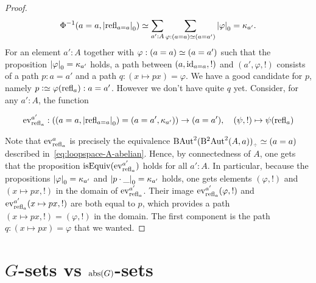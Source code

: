 \begin{proof}
\begin{displaymath}
    \Phi^{-1}(a=a,{\lvert\mathrm{refl}_{a=a}\rvert}_0) \simeq \sum_{a':A}
    \sum_{\varphi : (a=a) \simeq (a=a')}{\lvert\varphi\rvert}_0 = \kappa_{a'}.
  \end{displaymath}
  For an element $a':A$ together with $\varphi: (a=a) \simeq (a=a')$
  such that the proposition ${\lvert\varphi\rvert}_0 = \kappa_{a'}$ holds, a
  path between $(a,\mathord{\mathrm{id}}_{a=a},!)$ and $(a',\varphi,!)$ consists of a
  path $p:a=a'$ and a path $q:(x\mapsto p x) = \varphi$. We have a
  good candidate for $p$, namely $p\defequi \varphi(\refl
  a):a=a'$. However we don't have quite $q$ yet. Consider, for any
  $a':A$, the function
  \begin{fullwidth}
    \begin{displaymath}
      \ev_{\refl a}^{a'} :
      \left(
        (a=a, \settrunc{\refl{a=a}} ) =
        (a=a', \kappa_{a'} )
      \right)
      \to (a=a'),\quad (\psi,!) \mapsto \psi(\refl a)
    \end{displaymath}
  \end{fullwidth}
  Note that $\ev_{\refl a}^{a}$ is precisely the equivalence
  $\B\loopspace{(\BB\loopspace(A,a))}_\div \weq (a=a)$ described
  in~\cref{eq:loopspace-A-abelian}. Hence, by connectedness of $A$,
  one gets that the proposition $\isEq(\ev_{\refl a}^{a'})$ holds for
  all $a':A$. In particular, because the propositions
  ${\lvert\varphi\rvert}_0 = \kappa_{a'}$ and
  ${\lvert p\cdot\_\rvert}_0 = \kappa_{a'}$ holds, one gets elements
  $(\varphi,!)$ and $(x\mapsto px,!)$ in the domain of
  $\ev_{\refl a}^{a'}$. Their image $\ev_{\refl a}^{a'}(\varphi,!)$
  and $\ev_{\refl a}^{a'}(x\mapsto px,!)$ are both equal to $p$, which
  provides a path $(x\mapsto px,!)=(\varphi,!)$ in the domain. The
  first component is the path $q:(x\mapsto px) = \varphi$ that we
  wanted.
\end{proof}


\section{$G$-sets vs $\mathrm{abs}(G)$-sets}
\label{sec:Gsetsabstrconcr}

